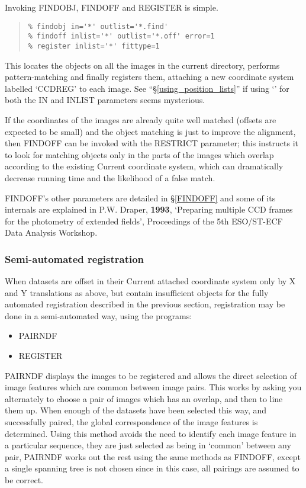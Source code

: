 \documentclass[twoside,11pt]{article}
\newcommand{\hyperref}[4]{#2\ref{#4}#3}
\newcommand{\htmlref}[2]{#1}
\newcommand{\xlabel}[1]{}
\renewcommand{\_}{\texttt{\symbol{95}}}
\newenvironment{myquote}{\begin{quote}\begin{small}}{\end{small}\end{quote}}
\newcommand{\text}[1]{{\small \tt #1}}
\newcommand{\routine}[1]{{\sc #1}}
\newcommand{\xroutine}[1]{\htmlref{{\sc #1}}{#1}}
\begin{document}
Invoking \xroutine{FINDOBJ}, \xroutine{FINDOFF} and
\xroutine{REGISTER} is simple.
\begin{myquote}
\begin{verbatim}
% findobj in='*' outlist='*.find'
% findoff inlist='*' outlist='*.off' error=1
% register inlist='*' fittype=1
\end{verbatim}
\end{myquote}
This locates the objects on all the images in the current directory,
performs pattern-matching and finally registers them, attaching
a new coordinate system labelled `CCD\_REG' to each image.
See ``\hyperref{Using position lists}{\S}{}{using_position_lists}''
if using `\text{*}' for both the IN and INLIST
parameters seems mysterious.

If the coordinates of the images are already quite well matched
(offsets are expected to be small) 
and the object matching is just to improve the alignment,
then \routine{FINDOFF} can be invoked with the RESTRICT parameter;
this instructs it to look for matching objects only in the
parts of the images which overlap according to the existing
Current coordinate system, which can dramatically decrease running time 
and the likelihood of a false match.

\routine{FINDOFF}'s other parameters are detailed in
\hyperref{a later section}{\S}{}{FINDOFF} and some of its internals are
explained in P.W. Draper, {\bf 1993}, `Preparing multiple CCD frames for the
photometry of extended fields', Proceedings of the 5th ESO/ST-ECF Data
Analysis Workshop.



\subsubsection{\xlabel{semiautomated}Semi-automated registration}

When datasets are offset in their Current attached coordinate system
only by X and Y translations as above,
but contain insufficient objects for the fully automated registration
described in the previous section, 
registration may be done in a semi-automated way,
using the programs:
\begin{itemize}
\item \xroutine{PAIRNDF}
\item \xroutine{REGISTER}
\end{itemize}

\routine{PAIRNDF} displays the images to be registered and allows the direct
selection of image features which are common between image pairs.
This works by asking you alternately to choose a pair of images
which has an overlap, and then to line them up.
When enough of the datasets have been selected this way, and
successfully paired, the global correspondence of the image features
is determined. Using this method avoids the need to identify each
image feature in a particular sequence, they are just selected as
being in `common' between any pair, \routine{PAIRNDF} works out the rest using
the same methods as \xroutine{FINDOFF}, except a single spanning tree is not
chosen since in this case, all pairings are assumed to be correct.
\end{document}
